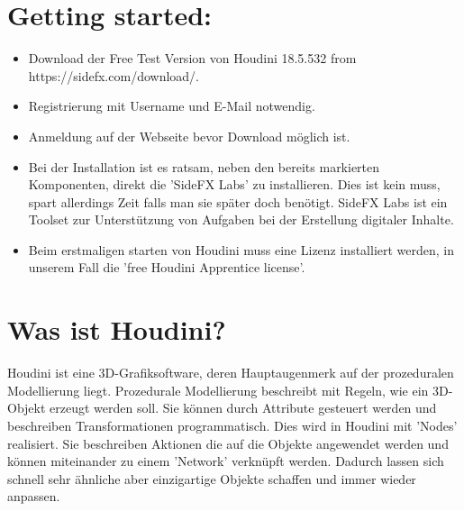 \documentclass[paper=a4,fontsize=12pt,ngerman]{scrartcl}
\begin{document}
	\pagestyle{plain}
	
	
	
	\section*{\textcolor{rosa}{Getting started:}}
	\begin{itemize}
		\item Download der Free Test Version von Houdini 18.5.532 from https://sidefx.com/download/.
		\item Registrierung mit Username und E-Mail notwendig.
		\item Anmeldung auf der Webseite bevor Download möglich ist.
		\item Bei der Installation ist es ratsam, neben den bereits markierten Komponenten, direkt die 'SideFX Labs' zu installieren. Dies ist kein muss, spart allerdings Zeit falls man sie später doch benötigt. SideFX Labs ist ein Toolset zur Unterstützung von Aufgaben bei der Erstellung digitaler Inhalte. 
		\item Beim erstmaligen starten von Houdini muss eine Lizenz installiert werden, in unserem Fall die 'free Houdini Apprentice license'.
	\end{itemize}

	\section*{\textcolor{rosa}{Was ist Houdini?}}
		Houdini ist eine 3D-Grafiksoftware, deren Hauptaugenmerk auf der prozeduralen Modellierung liegt. Prozedurale Modellierung beschreibt mit Regeln, wie ein 3D-Objekt erzeugt werden soll. Sie können durch Attribute gesteuert werden und beschreiben Transformationen programmatisch. Dies wird in Houdini mit 'Nodes' realisiert. Sie beschreiben Aktionen die auf die Objekte angewendet werden und können miteinander zu einem 'Network' verknüpft werden. Dadurch lassen sich schnell sehr ähnliche aber einzigartige Objekte schaffen und immer wieder anpassen.  
		
\end{document}
